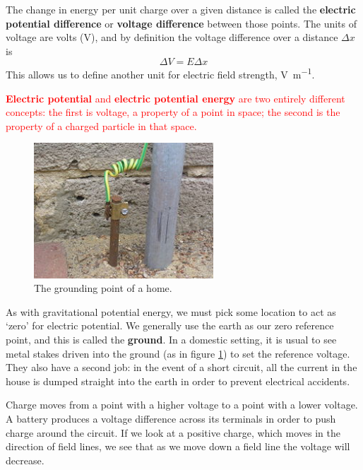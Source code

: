 \documentclass[a4paper]{amsbook}
\newcommand\capcite[1]{}
\begin{document}
The change in energy per unit charge over a given distance is called the \textbf{electric potential difference} or \textbf{voltage difference}
between those points. The units of voltage are volts (V), and by definition the voltage difference over a distance $ \Delta x $ is
\begin{equation}
  \Delta V = E \Delta x
\end{equation}
This allows us to define another unit for electric field strength, \si{\volt\per\metre}.

\textcolor{red}{\textbf{Electric potential} and \textbf{electric potential energy} are two entirely different concepts: the first is voltage,
a property of a point in space; the second is the property of a charged particle in that space.}

\begin{figure}
  \centering
  \includegraphics[width=0.6\textwidth]{ground}
  \caption{The grounding point of a home. \capcite{https://upload.wikimedia.org/wikipedia/commons/thumb/7/7d/HomeEarthRodAustralia1.jpg/250px-HomeEarthRodAustralia1.jpg}\label{fig:ground}}
\end{figure}

As with gravitational potential energy, we must pick some location to act as `zero' for electric potential. We generally use the earth
as our zero reference point, and this is called the \textbf{ground}. In a domestic setting, it is usual to see metal stakes driven into
the ground (as in figure \ref{fig:ground}) to set the reference voltage. They also have a second job: in the event of a short circuit,
all the current in the house is dumped straight into the earth in order to prevent electrical accidents.

Charge moves from a point with a higher voltage to a point with a lower voltage. A battery produces a voltage difference across its terminals
in order to push charge around the circuit. If we look at a positive charge, which moves in the direction of field lines, we see that as we move
down a field line the voltage will decrease.
\end{document}
